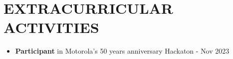 \documentclass[letterpaper,11pt]{article}
\newcommand{\resumeItem}[1]{
  \item\small{
    {#1 \vspace{-1pt}}
  }
}
\newcommand{\resumeItemListStart}{\begin{itemize}[leftmargin=0.1in]}
\newcommand{\resumeItemListEnd}{\end{itemize}\vspace{-5pt}}
\begin{document}
\section{\color{airforceblue}EXTRACURRICULAR ACTIVITIES}
    
      \resumeItemListStart
        \resumeItem{\normalsize{\textbf{Participant} in Motorola's 50 years anniversary Hackaton - {Nov 2023} }} 
        \vspace{-5pt}
        

      \resumeItemListEnd 
      
\vspace{-12pt}
\end{document}
